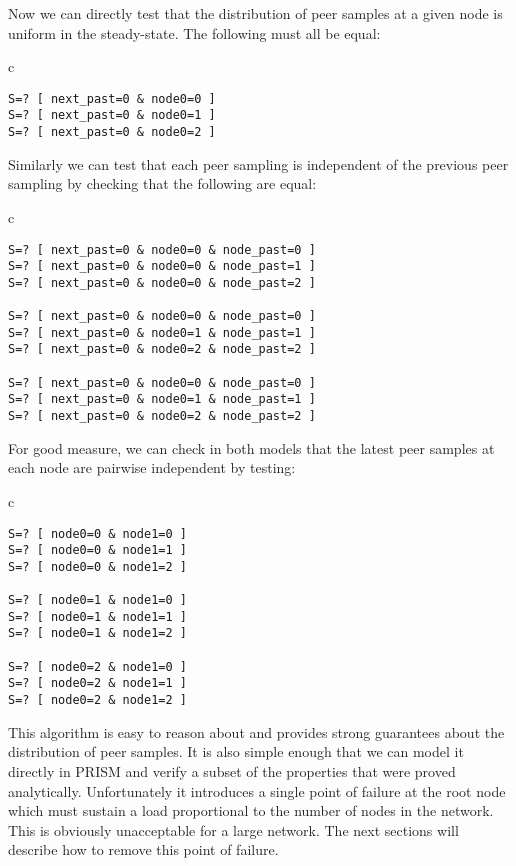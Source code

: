\documentclass[a4paper,10pt]{article}
\newenvironment{prismprop}[0]{
  \begin{center}
  \begin{tabular}{c}
  \footnotesize
}{
  \end{tabular}
  \end{center}
}
\begin{document}
Now we can directly test that the distribution of peer samples at a given node is uniform in the steady-state. The following must all be equal:

\begin{prismprop}
\begin{lstlisting}
S=? [ next_past=0 & node0=0 ]
S=? [ next_past=0 & node0=1 ]
S=? [ next_past=0 & node0=2 ]
\end{lstlisting}
\end{prismprop}

Similarly we can test that each peer sampling is independent of the previous peer sampling by checking that the following are equal:

\begin{prismprop}
\begin{lstlisting}
S=? [ next_past=0 & node0=0 & node_past=0 ]
S=? [ next_past=0 & node0=0 & node_past=1 ]
S=? [ next_past=0 & node0=0 & node_past=2 ]

S=? [ next_past=0 & node0=0 & node_past=0 ]
S=? [ next_past=0 & node0=1 & node_past=1 ]
S=? [ next_past=0 & node0=2 & node_past=2 ]

S=? [ next_past=0 & node0=0 & node_past=0 ]
S=? [ next_past=0 & node0=1 & node_past=1 ]
S=? [ next_past=0 & node0=2 & node_past=2 ]
\end{lstlisting}
\end{prismprop}

For good measure, we can check in both models that the latest peer samples at each node are pairwise independent by testing:

\begin{prismprop}
\begin{lstlisting}
S=? [ node0=0 & node1=0 ]
S=? [ node0=0 & node1=1 ]
S=? [ node0=0 & node1=2 ]

S=? [ node0=1 & node1=0 ]
S=? [ node0=1 & node1=1 ]
S=? [ node0=1 & node1=2 ]

S=? [ node0=2 & node1=0 ]
S=? [ node0=2 & node1=1 ]
S=? [ node0=2 & node1=2 ]
\end{lstlisting}
\end{prismprop}

This algorithm is easy to reason about and provides strong guarantees about the distribution of peer samples. It is also simple enough that we can model it directly in PRISM and verify a subset of the properties that were proved analytically. Unfortunately it introduces a single point of failure at the root node which must sustain a load proportional to the number of nodes in the network. This is obviously unacceptable for a large network. The next sections will describe how to remove this point of failure.
\end{document}
